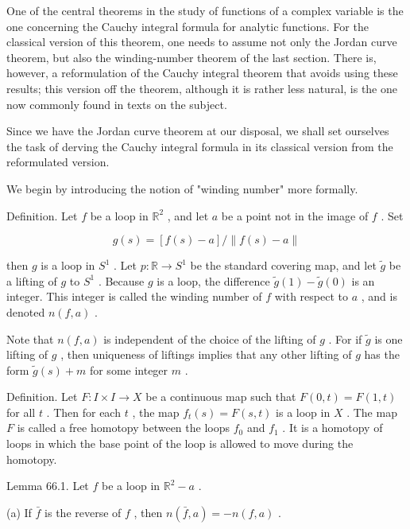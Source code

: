 One of the central theorems in the study of functions of a complex variable is the one concerning the Cauchy integral formula for analytic functions. For the classical version of this theorem, one needs to assume not only the Jordan curve theorem, but also the winding-number theorem of the last section. There is, however, a reformulation of the Cauchy integral theorem that avoids using these results; this version off the theorem, although it is rather less natural, is the one now commonly found in texts on the subject.

Since we have the Jordan curve theorem at our disposal, we shall set ourselves the task of derving the Cauchy integral formula in its classical version from the reformulated version.

We begin by introducing the notion of "winding number" more formally.

Definition. Let \(f\) be a loop in \({\mathbb{R}}^{2}\) , and let \(a\) be a point not in the image of \(f\) . Set

\[
g\left( s\right)  = \left\lbrack  {f\left( s\right)  - a}\right\rbrack  /\parallel f\left( s\right)  - a\parallel
\]

then \(g\) is a loop in \({S}^{1}\) . Let \(p : \mathbb{R} \rightarrow  {S}^{1}\) be the standard covering map, and let \(\widetilde{g}\) be a lifting of \(g\) to \({S}^{1}\) . Because \(g\) is a loop, the difference \(\widetilde{g}\left( 1\right)  - \widetilde{g}\left( 0\right)\) is an integer. This integer is called the winding number of \(f\) with respect to \(a\) , and is denoted \(n\left( {f,a}\right)\) .

Note that \(n\left( {f,a}\right)\) is independent of the choice of the lifting of \(g\) . For if \(\widetilde{g}\) is one lifting of \(g\) , then uniqueness of liftings implies that any other lifting of \(g\) has the form \(\widetilde{g}\left( s\right)  + m\) for some integer \(m\) .

Definition. Let \(F : I \times  I \rightarrow  X\) be a continuous map such that \(F\left( {0,t}\right)  = F\left( {1,t}\right)\) for all \(t\) . Then for each \(t\) , the map \({f}_{t}\left( s\right)  = F\left( {s,t}\right)\) is a loop in \(X\) . The map \(F\) is called a free homotopy between the loops \({f}_{0}\) and \({f}_{1}\) . It is a homotopy of loops in which the base point of the loop is allowed to move during the homotopy.

Lemma 66.1. Let \(f\) be a loop in \({\mathbb{R}}^{2} - a\) .

(a) If \(\bar{f}\) is the reverse of \(f\) , then \(n\left( {\bar{f},a}\right)  =  - n\left( {f,a}\right)\) .

